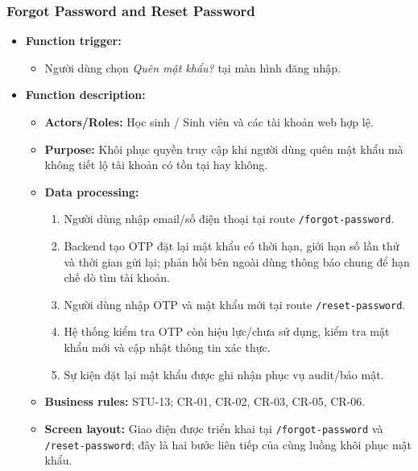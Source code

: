 \documentclass[12pt,a4paper,oneside]{report}
\begin{document}


\subsubsection{Forgot Password and Reset Password}
\label{subsubsec:forgot-reset-password}

\begin{itemize}
    \item \textbf{Function trigger:}
    \begin{itemize}
        \item Người dùng chọn \textit{Quên mật khẩu?} tại màn hình đăng nhập.
    \end{itemize}
    \item \textbf{Function description:}
    \begin{itemize}
        \item \textbf{Actors/Roles:} Học sinh / Sinh viên và các tài khoản web hợp lệ.
        \item \textbf{Purpose:} Khôi phục quyền truy cập khi người dùng quên mật khẩu mà không tiết lộ tài khoản có tồn tại hay không.
        \item \textbf{Data processing:}
        \begin{enumerate}
            \item Người dùng nhập email/số điện thoại tại route \texttt{/forgot-password}.
            \item Backend tạo OTP đặt lại mật khẩu có thời hạn, giới hạn số lần thử và thời gian gửi lại; phản hồi bên ngoài dùng thông báo chung để hạn chế dò tìm tài khoản.
            \item Người dùng nhập OTP và mật khẩu mới tại route \texttt{/reset-password}.
            \item Hệ thống kiểm tra OTP còn hiệu lực/chưa sử dụng, kiểm tra mật khẩu mới và cập nhật thông tin xác thực.
            \item Sự kiện đặt lại mật khẩu được ghi nhận phục vụ audit/bảo mật.
        \end{enumerate}
        \item \textbf{Business rules:} STU-13; CR-01, CR-02, CR-03, CR-05, CR-06.
        \item \textbf{Screen layout:} Giao diện được triển khai tại \texttt{/forgot-password} và \texttt{/reset-password}; đây là hai bước liên tiếp của cùng luồng khôi phục mật khẩu.
    \end{itemize}
\end{itemize}
\end{document}
